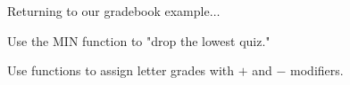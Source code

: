 Returning to our gradebook example$\ldots$

Use the MIN function to "drop the lowest quiz."

Use functions to assign letter grades with $+$ and $-$ modifiers.
